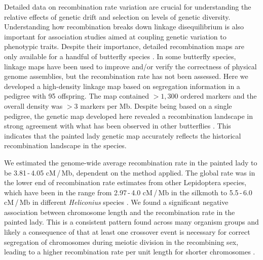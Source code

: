 \documentclass[twocolumn]{bmcart}%
\begin{document}
Detailed data on recombination rate variation are crucial for understanding the relative effects of genetic drift and selection on levels of genetic diversity. Understanding how recombination breaks down linkage disequilibrium is also important for association studies aimed at coupling genetic variation to phenotypic traits. Despite their importance, detailed recombination maps are only available for a handful of butterfly species \citep{beldadeGeneBasedLinkageMap2009, celorio-manceraChromosomeLevelAssembly2021, daveyNoEvidenceMaintenance2017, rosserComplexBasisHybrid2022, smolanderImprovedChromosomelevelGenome2022, tunstromComplexInterplayBalancing2021}. In some butterfly species, linkage maps have been used to improve and/or verify the correctness of physical genome assemblies, but the recombination rate has not been assessed. Here we developed a high-density linkage map based on segregation information in a pedigree with 95 offspring. The map contained $> 1,300$ ordered markers and the overall density was $> 3$ markers per Mb. Despite being based on a single pedigree, the genetic map developed here revealed a recombination landscape in strong agreement with what has been observed in other butterflies \citep{daveyNoEvidenceMaintenance2017, martinRecombinationRateVariation2019}. This indicates that the painted lady genetic map accurately reflects the historical recombination landscape in the species. 

We estimated the genome-wide average recombination rate in the painted lady to be 3.81\,-\,4.05 cM\,/\,Mb, dependent on the method applied. The global rate was in the lower end of recombination rate estimates from other Lepidoptera species, which have been in the range from 2.97\,-\,4.0 cM\,/\,Mb in the silkmoth \citep{yamamotoBACbasedIntegratedLinkage2008, yasukochiDenseGeneticMap1998} to 5.5\,-\,6.0 cM\,/\,Mb in different \textit{Heliconius} species \citep{jigginsGeneticLinkageMap2005, toblerFirstgenerationLinkageMap2005}. We found a significant negative association between chromosome length and the recombination rate in the painted lady. This is a consistent pattern found across many organism groups and likely a consequence of that at least one crossover event is necessary for correct segregation of chromosomes during meiotic division in the recombining sex, leading to a higher recombination rate per unit length for shorter chromosomes \citep{haenelMetaanalysisChromosomescaleCrossover2018, kawakamiWholegenomePatternsLinkage2017, martinRecombinationRateVariation2019}. 
\end{document}
